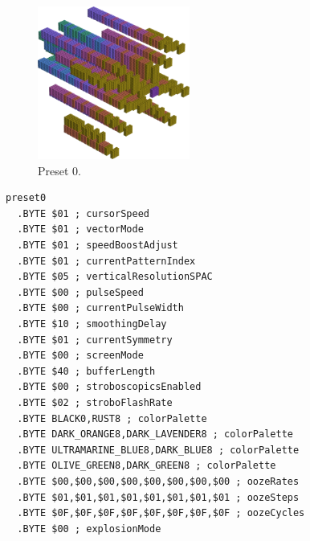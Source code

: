 \clearpage
\begin{minipage}[b]{0.48\linewidth}
\begin{figure}[H]                                                          
  \centering                                                             
  \begin{adjustbox}{width=5cm,center}                                   
  \includegraphics[width=5cm]{src/colorspace_presets/preset0-45.png}%
  \end{adjustbox}                                                        
\caption*{Preset 0.}                                           
\end{figure}                                                               
\end{minipage}
\hspace{0.1cm}
\begin{minipage}[b]{0.48\linewidth}                            
\begin{lstlisting}[basicstyle=\ttfamily\tiny]
preset0
  .BYTE $01 ; cursorSpeed
  .BYTE $01 ; vectorMode
  .BYTE $01 ; speedBoostAdjust
  .BYTE $01 ; currentPatternIndex
  .BYTE $05 ; verticalResolutionSPAC
  .BYTE $00 ; pulseSpeed
  .BYTE $00 ; currentPulseWidth
  .BYTE $10 ; smoothingDelay
  .BYTE $01 ; currentSymmetry
  .BYTE $00 ; screenMode
  .BYTE $40 ; bufferLength
  .BYTE $00 ; stroboscopicsEnabled
  .BYTE $02 ; stroboFlashRate
  .BYTE BLACK0,RUST8 ; colorPalette
  .BYTE DARK_ORANGE8,DARK_LAVENDER8 ; colorPalette
  .BYTE ULTRAMARINE_BLUE8,DARK_BLUE8 ; colorPalette
  .BYTE OLIVE_GREEN8,DARK_GREEN8 ; colorPalette
  .BYTE $00,$00,$00,$00,$00,$00,$00,$00 ; oozeRates
  .BYTE $01,$01,$01,$01,$01,$01,$01,$01 ; oozeSteps
  .BYTE $0F,$0F,$0F,$0F,$0F,$0F,$0F,$0F ; oozeCycles
  .BYTE $00 ; explosionMode
\end{lstlisting}
\end{minipage}

\vspace*{-0.5cm}

